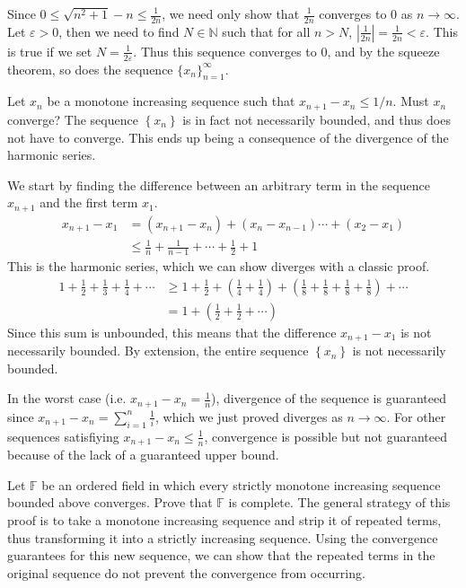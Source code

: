 \documentclass[10pt]{amsart}
\theoremstyle{plain}
\newenvironment{exercise}[1]{%
  \renewcommand\themanualtheoreminner{#1}%
  \manualtheoreminner
}{\endmanualtheoreminner}
\theoremstyle{definition}
\newcommand{\<}{\langle}
\renewcommand{\>}{\rangle}
\begin{document}
Since $0 \leq \sqrt{n^2+1} -n \leq \frac{1}{2n}$, we need only show that $\frac{1}{2n}$ converges to $0$ as $n\to\infty$. Let $\varepsilon > 0$, then we need to find $N \in \mathbb{N}$ such that for all $n > N$, $|\frac{1}{2n}| = \frac{1}{2n} < \varepsilon$. This is true if we set $N = \frac{1}{2\varepsilon}$. Thus this sequence converges to 0, and by the squeeze theorem, so does the sequence $\{x_n\}_{n=1}^\infty$.

\begin{exercise}{1.2.4}
	Let $x_n$ be a monotone increasing sequence such that $x_{n+1}-x_n \leq 1/n$. Must $x_n$ converge?
\end{exercise}
The sequence $\left\{ x_n \right\}$ is in fact not necessarily bounded, and thus does not have to converge. This ends up being a consequence of the divergence of the harmonic series.

We start by finding the difference between an arbitrary term in the sequence $x_{n+1}$ and the first term $x_1$.
\begin{align*}
	x_{n+1} - x_1 &= (x_{n+1} - x_n) + (x_n - x_{n-1})  \cdots + (x_2 - x_1) \\
		      &\leq \frac{1}{n} + \frac{1}{n-1} + \cdots + \frac{1}{2}  + 1
\end{align*}
This is the harmonic series, which we can show diverges with a classic proof.
\begin{align*}
	1 + \frac{1}{2} + \frac{1}{3} + \frac{1}{4} + \cdots &\geq 1 + \frac{1}{2} + \left( \frac{1}{4} + \frac{1}{4}  \right) + \left( \frac{1}{8} + \frac{1}{8} +\frac{1}{8} + \frac{1}{8}   \right) + \cdots \\
						    &= 1 + \left( \frac{1}{2} + \frac{1}{2} + \cdots \right)
\end{align*}
Since this sum is unbounded, this means that the difference $x_{n+1} - x_1$ is not necessarily bounded. By extension, the entire sequence  $\left\{ x_n \right\}$ is not necessarily bounded.

In the worst case (i.e. $x_{n+1} - x_n = \frac{1}{n} $), divergence of the sequence is guaranteed since $x_{n+1} - x_n = \sum_{i=1}^n \frac{1}{i} $, which we just proved diverges as $n \to \infty$. For other sequences satisfiying $x_{n+1}-x_n \leq \frac{1}{n} $, convergence is possible but not guaranteed because of the lack of a guaranteed upper bound.

\begin{exercise}{1.2.5}
	Let $\mathbb{F}$ be an ordered field in which every strictly monotone increasing sequence bounded above converges. Prove that $\mathbb{F}$ is complete.
\end{exercise}
The general strategy of this proof is to take a monotone increasing sequence and strip it of repeated terms, thus transforming it into a strictly increasing sequence. Using the convergence guarantees for this new sequence, we can show that the repeated terms in the original sequence do not prevent the convergence from occurring.
\end{document}
